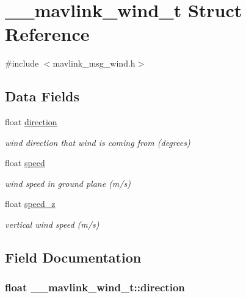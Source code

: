 \hypertarget{struct____mavlink__wind__t}{\section{\+\_\+\+\_\+mavlink\+\_\+wind\+\_\+t Struct Reference}
\label{struct____mavlink__wind__t}
}


{\ttfamily \#include $<$mavlink\+\_\+msg\+\_\+wind.\+h$>$}

\subsection*{Data Fields}
\begin{DoxyCompactItemize}
\item 
float \hyperlink{struct____mavlink__wind__t_afefbf465e0bdb533ada043b8be186ef1}{direction}
\begin{DoxyCompactList}\small\item\em wind direction that wind is coming from (degrees) \end{DoxyCompactList}\item 
float \hyperlink{struct____mavlink__wind__t_a0223c35a47884f77ea93fe17398aefb1}{speed}
\begin{DoxyCompactList}\small\item\em wind speed in ground plane (m/s) \end{DoxyCompactList}\item 
float \hyperlink{struct____mavlink__wind__t_a3e784dbb8e040577732f2dbb97c14603}{speed\+\_\+z}
\begin{DoxyCompactList}\small\item\em vertical wind speed (m/s) \end{DoxyCompactList}\end{DoxyCompactItemize}


\subsection{Field Documentation}
\hypertarget{struct____mavlink__wind__t_afefbf465e0bdb533ada043b8be186ef1}{
\subsubsection[{direction}]{\setlength{\rightskip}{0pt plus 5cm}float \+\_\+\+\_\+mavlink\+\_\+wind\+\_\+t\+::direction}}\label{struct____mavlink__wind__t_afefbf465e0bdb533ada043b8be186ef1}


